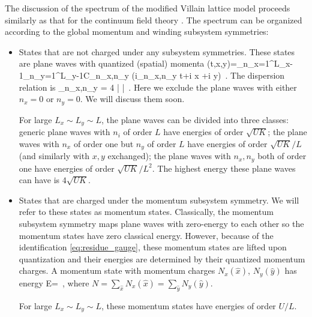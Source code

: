 \documentclass[12pt]{article}
\numberwithin{equation}{section}
\begin{document}
The discussion of the spectrum of the modified Villain lattice model proceeds similarly as that for the continuum field theory \cite{paper1}.
The spectrum can be organized according to the global momentum and winding subsystem symmetries:
\begin{itemize}
	\item
	States that are not charged under any subsystem symmetries. These states are plane waves with quantized (spatial) momenta
	\ie
	\phi(t,\hat x,\hat y)=\sum_{n_x=1}^{L_x-1}\sum_{n_y=1}^{L_y-1}C_{n_x,n_y} \exp\left(i\omega_{n_x,n_y} t+i \hat x +i \hat y\right)~.
	\fe
	The dispersion relation is
	\ie
	\omega_{n_x,n_y} = 4 \left|  \right|~.
	\fe
	Here we exclude the plane waves with either $n_x=0$ or $n_y=0$. We will discuss them soon.
	
	For large $L_x\sim L_y\sim L$, the plane waves can be divided into three classes: generic plane waves with $n_i$ of order $L$ have energies of order $\sqrt{UK}$; the plane waves with  $n_x$ of order one but  $n_y$ of order $L$ have energies of order $\sqrt{UK}/L$ (and similarly with $x,y$ exchanged); the plane waves with  $n_x,n_y$ both of order one have energies of order ${\sqrt{UK}}/{L^2}$. The highest energy these plane waves can have is $4\sqrt{UK}$.
	\item
	States that are charged under   the momentum subsystem symmetry. We will refer to these states as momentum states. Classically, the momentum subsystem symmetry maps plane waves with zero-energy to each other so the momentum states have zero classical energy. However, because of the identification \eqref{eq:residue_gauge}, these momentum states are lifted upon quantization and their energies are determined by their quantized momentum charges. A momentum state with momentum charges $N_x(\hat x)$, $N_y(\hat y)$ has energy
	\ie\label{XYmomentum}
	E=~,
	\fe
	where $N = \sum_{\hat x} N_x(\hat x)=\sum_{\hat y} N_y(\hat y)$.
	
	For large $L_x\sim L_y\sim L$, these momentum states have energies of order ${U}/{L}$.
	

\end{itemize}
\end{document}
